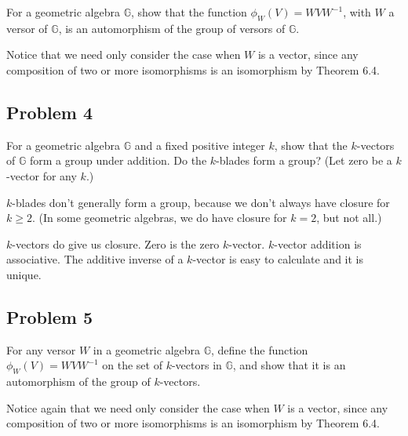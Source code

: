 \documentclass[12pt]{article}
\newcommand{\G}{\mathbb{G}}
\begin{document}
For a geometric algebra $\G$, show that
the function $\phi_W(V)=WVW^{-1}$, with $W$ a versor of $\G$,
is an automorphism of the group of versors of $\G$.

Notice that we need only consider the case when $W$ is a vector,
since any composition of two or more isomorphisms is an isomorphism by
Theorem 6.4.

\subsection*{Problem 4}

For a geometric algebra $\G$ and a fixed positive integer $k$, show that the $k$-vectors of $\G$
form a group under addition.  Do the $k$-blades form a group?  (Let zero be a $k$-vector for any $k$.)

$k$-blades don't generally form a group, because we don't always have closure for $k\geq 2$.
(In some geometric algebras, we do have closure for $k=2$, but not all.)

$k$-vectors do give us closure.  Zero is the zero $k$-vector.  $k$-vector addition is associative.
The additive inverse of a $k$-vector is easy to calculate and it is unique.

\subsection*{Problem 5}

For any versor $W$ in a geometric algebra $\G$, define
the function $\phi_W(V)=WVW^{-1}$ on the set of $k$-vectors in $\G$,
and show that it is an automorphism of the group of $k$-vectors.

Notice again that we need only consider the case when $W$ is a vector,
since any composition of two or more isomorphisms is an isomorphism by
Theorem 6.4.
\end{document}

